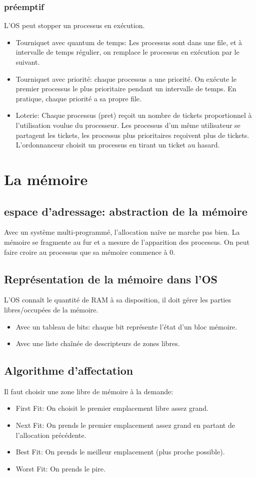 \documentclass[10pt,a4paper]{article}
\begin{document}
		\subsubsection{préemptif}
			L'OS peut stopper un processus en exécution.
			\begin{itemize}
				\item Tourniquet avec quantum de temps: Les processus sont dans une file, et à intervalle de temps régulier, on remplace le processus en exécution par le suivant.
				\item Tourniquet avec priorité: chaque processus a une priorité. On exécute le premier processus le plus prioritaire pendant un intervalle de temps. En pratique, chaque priorité a sa propre file.
				\item Loterie: Chaque processus (pret) reçoit un nombre de tickets proportionnel à l'utilisation voulue du processeur. Les processus d'un même utilisateur se partagent les tickets, les processus plus prioritaires reçoivent plus de tickets. L’ordonnanceur choisit un processus en tirant un ticket au hasard.
			\end{itemize}
\section{La mémoire}
		\subsection{espace d'adressage: abstraction de la mémoire}
			Avec un système multi-programmé, l'allocation naïve ne marche pas bien. La mémoire se fragmente au fur et a mesure de l'apparition des processus. On peut faire croire au processus que sa mémoire commence à 0.
		\subsection{Représentation de la mémoire dans l'OS}
			L'OS connaît le quantité de RAM à sa disposition, il doit gérer les parties libres/occupées de la mémoire.
			\begin{itemize}
				\item Avec un tableau de bits: chaque bit représente l'état d'un bloc mémoire.
				\item Avec une liste chaînée de descripteurs de zones libres.
			\end{itemize}
		\subsection{Algorithme d'affectation}
			Il faut choisir une zone libre de mémoire à la demande:
			\begin{itemize}
				\item First Fit: On choisit le premier emplacement libre assez grand.
				\item Next Fit: On prends le premier emplacement assez grand en partant de l'allocation précédente.
				\item Best Fit: On prends le meilleur emplacement (plus proche possible).
				\item Worst Fit: On prends le pire.
			\end{itemize}
\end{document}
